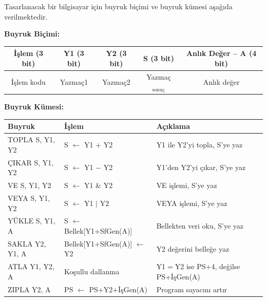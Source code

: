 \begin{alistirma}[\zor]
Tasarlanacak bir bilgisayar için buyruk biçimi ve buyruk kümesi aşağıda verilmektedir.

\textbf{Buyruk Biçimi:}
\begin{center}
\small
\begin{tabular}{|c|c|c|c|c|}
\hline
İşlem (3 bit) & Y1 (3 bit) & Y2 (3 bit) & S (3 bit) & Anlık Değer -- A (4 bit) \\
\hline
\multicolumn{1}{|c}{\scriptsize İşlem kodu} & \multicolumn{1}{c}{\scriptsize Yazmaç1} & \multicolumn{1}{c}{\scriptsize Yazmaç2} & \multicolumn{1}{c}{\scriptsize Yazmaç$_{\text{sonuç}}$} & \multicolumn{1}{c|}{\scriptsize Anlık değer} \\
\hline
\end{tabular}
\end{center}

\textbf{Buyruk Kümesi:}

\begin{center}
\small
\begin{tabular}{@{}llp{6.2cm}@{}}
\toprule
\textbf{Buyruk} & \textbf{İşlem} & \textbf{Açıklama} \\
\midrule
TOPLA S, Y1, Y2 & S $\leftarrow$ Y1 + Y2 & Y1 ile Y2'yi topla, S'ye yaz \\
ÇIKAR S, Y1, Y2 & S $\leftarrow$ Y1 $-$ Y2 & Y1'den Y2'yi çıkar, S'ye yaz \\
VE S, Y1, Y2 & S $\leftarrow$ Y1 \& Y2 & VE işlemi, S'ye yaz \\
VEYA S, Y1, Y2 & S $\leftarrow$ Y1 $|$ Y2 & VEYA işlemi, S'ye yaz \\
YÜKLE S, Y1, A & S $\leftarrow$ Bellek[Y1+SfGen(A)] & Bellekten veri oku, S'ye yaz \\
SAKLA Y2, Y1, A & Bellek[Y1+SfGen(A)] $\leftarrow$ Y2 & Y2 değerini belleğe yaz \\
ATLA Y1, Y2, A & Koşullu dallanma & Y1$=$Y2 ise PS+4, değilse PS+İşGen(A) \\
ZIPLA Y2, A & PS $\leftarrow$ PS+Y2+İşGen(A) & Program sayacını artır \\
\bottomrule
\end{tabular}
\end{center}


\end{alistirma}
